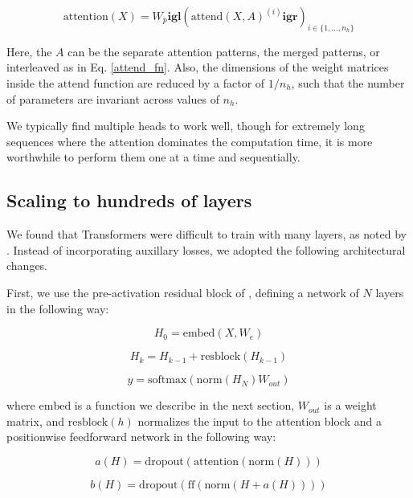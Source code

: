 \begin{equation}
\mathrm{attention}(X) = W_p \mathbf{igl}( \mathrm{attend}(X, A)^{(i)} \mathbf{igr})_{i \in \{1, ..., n_{h}\}}
\end{equation}

Here, the $A$ can be the separate attention patterns, the merged patterns, or interleaved as in Eq. \ref{attend_fn}. Also, the dimensions of the weight matrices inside the $\mathrm{attend}$ function are reduced by a factor of $1/n_{h}$, such that the number of parameters are invariant across values of $n_{h}$.

We typically find multiple heads to work well, though for extremely long sequences where the attention dominates the computation time, it is more worthwhile to perform them one at a time and sequentially.

\subsection{Scaling to hundreds of layers}

We found that Transformers were difficult to train with many layers, as noted by \cite{al2018character}. Instead of incorporating auxillary losses, we adopted the following architectural changes.

First, we use the pre-activation residual block of \cite{He2016}, defining a network of $N$ layers in the following way:

\begin{equation}H_0 = \mathrm{embed}(X, W_e)\end{equation}

\begin{equation}H_k = H_{k-1} + \mathrm{resblock}(H_{k-1})\end{equation}

\begin{equation}y = \mathrm{softmax}(\mathrm{norm}(H_N) W_{out})\end{equation}

where $\mathrm{embed}$ is a function we describe in the next section, $W_{out}$ is a weight matrix, and $\mathrm{resblock}(h)$ normalizes the input to the attention block and a positionwise feedforward network in the following way:

\begin{equation}a(H) = \mathrm{dropout}(\mathrm{attention}(\mathrm{norm}(H)))\end{equation}

\begin{equation}b(H) = \mathrm{dropout}(\mathrm{ff}(\mathrm{norm}(H + a(H))))\end{equation}

